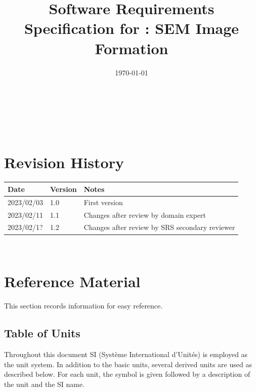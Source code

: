 \documentclass[12pt]{article}
\begin{document}

\title{Software Requirements Specification for \progname: SEM Image Formation} 
\author{\authname}
\date{\today}
	
\maketitle

~\newpage


\tableofcontents

~\newpage

\section*{Revision History}

\begin{tabularx}{\textwidth}{p{3cm}p{2cm}X}
\toprule {\bf Date} & {\bf Version} & {\bf Notes}\\
\midrule
2023/02/03 & 1.0 & First version\\
2023/02/11 & 1.1 & Changes after review by domain expert\\
2023/02/1? & 1.2 & Changes after review by SRS secondary reviewer\\
\bottomrule
\end{tabularx}

~\newpage

\section{Reference Material}

This section records information for easy reference.

\subsection{Table of Units}

Throughout this document SI (Syst\`{e}me International d'Unit\'{e}s) is employed
as the unit system.  In addition to the basic units, several derived units are
used as described below.  For each unit, the symbol is given followed by a
description of the unit and the SI name.
~\newline
\end{document}
